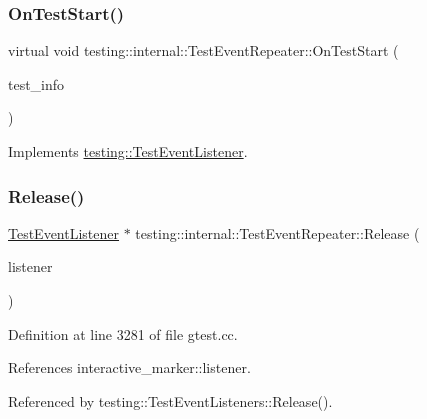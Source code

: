 \subsubsection{\texorpdfstring{On\+Test\+Start()}{OnTestStart()}}
{\footnotesize\ttfamily virtual void testing\+::internal\+::\+Test\+Event\+Repeater\+::\+On\+Test\+Start (\begin{DoxyParamCaption}\item[{const \hyperlink{classtesting_1_1TestInfo}{Test\+Info} \&}]{test\+\_\+info }\end{DoxyParamCaption})\hspace{0.3cm}{\ttfamily [virtual]}}



Implements \hyperlink{classtesting_1_1TestEventListener_ab4f6a0ca16ae75daf385b3b5914e1048}{testing\+::\+Test\+Event\+Listener}.

\mbox{\label{classtesting_1_1internal_1_1TestEventRepeater_ac77a3d127e4726e11694e4ee9cf3b793}} 
\subsubsection{\texorpdfstring{Release()}{Release()}}
{\footnotesize\ttfamily \hyperlink{classtesting_1_1TestEventListener}{Test\+Event\+Listener} $\ast$ testing\+::internal\+::\+Test\+Event\+Repeater\+::\+Release (\begin{DoxyParamCaption}\item[{\hyperlink{classtesting_1_1TestEventListener}{Test\+Event\+Listener} $\ast$}]{listener }\end{DoxyParamCaption})}



Definition at line 3281 of file gtest.\+cc.



References interactive\+\_\+marker\+::listener.



Referenced by testing\+::\+Test\+Event\+Listeners\+::\+Release().



